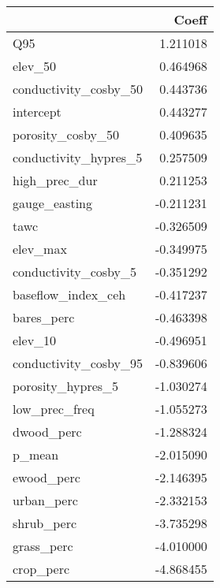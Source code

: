 \begin{tabular}{lr}
\toprule
{} &     Coeff \\
\midrule
Q95                   &  1.211018 \\
elev\_50               &  0.464968 \\
conductivity\_cosby\_50 &  0.443736 \\
intercept             &  0.443277 \\
porosity\_cosby\_50     &  0.409635 \\
conductivity\_hypres\_5 &  0.257509 \\
high\_prec\_dur         &  0.211253 \\
gauge\_easting         & -0.211231 \\
tawc                  & -0.326509 \\
elev\_max              & -0.349975 \\
conductivity\_cosby\_5  & -0.351292 \\
baseflow\_index\_ceh    & -0.417237 \\
bares\_perc            & -0.463398 \\
elev\_10               & -0.496951 \\
conductivity\_cosby\_95 & -0.839606 \\
porosity\_hypres\_5     & -1.030274 \\
low\_prec\_freq         & -1.055273 \\
dwood\_perc            & -1.288324 \\
p\_mean                & -2.015090 \\
ewood\_perc            & -2.146395 \\
urban\_perc            & -2.332153 \\
shrub\_perc            & -3.735298 \\
grass\_perc            & -4.010000 \\
crop\_perc             & -4.868455 \\
\bottomrule
\end{tabular}

